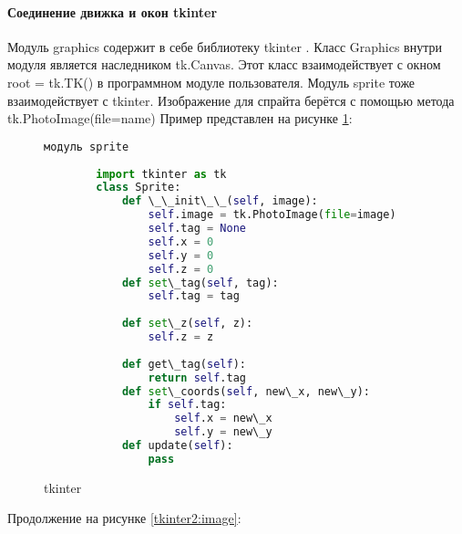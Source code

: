 \paragraph{Соединение движка и окон tkinter}
Модуль graphics содержит в себе библиотеку tkinter . Класс Graphics внутри модуля является наследником tk.Canvas. Этот класс взаимодействует с окном root = tk.TK() в программном модуле пользователя. Модуль sprite тоже взаимодействует с tkinter. Изображение для спрайта берётся с помощью метода tk.PhotoImage(file=name)
Пример представлен на рисунке \ref{tk:image}:
\begin{figure}[H]
	\begin{lstlisting}[language=Python]
		модуль sprite
		
		import tkinter as tk
		class Sprite:
			def \_\_init\_\_(self, image):
				self.image = tk.PhotoImage(file=image)
				self.tag = None
				self.x = 0
				self.y = 0
				self.z = 0		
			def set\_tag(self, tag):
				self.tag = tag
				
			def set\_z(self, z):
				self.z = z
				
			def get\_tag(self):
				return self.tag	
			def set\_coords(self, new\_x, new\_y):
				if self.tag:
					self.x = new\_x
					self.y = new\_y
			def update(self):
				pass
	\end{lstlisting}  
\caption{tkinter}
\label{tk:image}
\end{figure}
Продолжение на рисунке \ref{tkinter2:image}:
